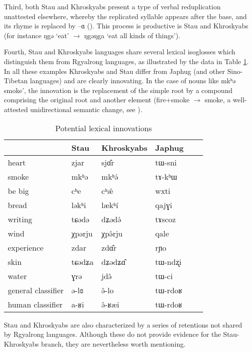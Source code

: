 \documentclass[oneside,a4paper,11pt]{article}
\newcommand{\ipa}[1]{{\phon #1}} %
\begin{document}
Third, both Stau and Khroskyabs present a type of verbal reduplication unattested elsewhere, whereby the replicated syllable appears after the base, and its rhyme is replaced by \ipa{--ɑ} (\citealt{lai13fuyin}). This process is productive is Stau and Khroskyabs (for instance \ipa{ŋgə} `eat' $\rightarrow$ \ipa{ŋgəŋga} `eat all kinds of things').
 
 
 Fourth, Stau and Khroskyabs languages share several lexical isoglosses which distinguish them from Rgyalrong languages, as illustrated by the data in Table \ref{tab:lexicon}. In all these examples Khroskyabs and Stau differ from Japhug (and other Sino-Tibetan languages) and are clearly innovating. In the case of nouns like \ipa{mkʰə}  smoke', the innovation is the replacement of the simple root by a compound comprising the original root and another element (fire+smoke $\rightarrow$ smoke, a well-attested unidirectional semantic change, see \citealt{urban11semantic}).

  \begin{table}[h]
  \caption{Potential lexical innovations} \label{tab:lexicon} \centering
 \begin{tabular}{llllll}
 \toprule
 &	Stau &	Khroskyabs &	Japhug &	\\	
  \midrule
heart &	\ipa{zjar}  &	\ipa{sjɑ̂r} &	\ipa{tɯ-sni} &	\\	
smoke  &	\ipa{mkʰə} &	\ipa{mkʰə́} &	\ipa{tɤ-kʰɯ} &	\\	
be big  &	\ipa{cʰe} &	\ipa{cʰæ̂} &	\ipa{wxti} &	\\	
bread  &	\ipa{ləkʰi} &	\ipa{lækʰí} &	\ipa{qajɣi} &	\\	
writing  &	\ipa{tɕədə} &	\ipa{dʑədə́} &	\ipa{tɤscoz} &	\\	
wind  &	\ipa{χpərju} &	\ipa{χpə̂rju    } &	\ipa{qale} &	\\	
experience  &	\ipa{zdar} &	\ipa{zdɑ̂r} &	\ipa{rɲo} &	\\	
skin  &	\ipa{tɕədʑa} &	\ipa{dʑədʑɑ̂} &	\ipa{tɯ-ndʐi} &	\\	
water  &	\ipa{ɣrə} &	\ipa{jdə̂} &	\ipa{tɯ-ci} &	\\
general classifier  &	\ipa{ə-lɞ} &	\ipa{ə̂-lo} &	\ipa{tɯ-rdoʁ} &	\\	
human classifier  &	\ipa{a-ʁi} &	\ipa{ə̂-ʁæi} &	\ipa{tɯ-rdoʁ} &	\\	
\bottomrule
\end{tabular}
\end{table}

Stau and Khroskyabs are also characterized by a series of retentions not shared by Rgyalrong languages. Although these do not provide evidence for the Stau-Khroskyabs branch, they are nevertheless worth mentioning.
\end{document}
